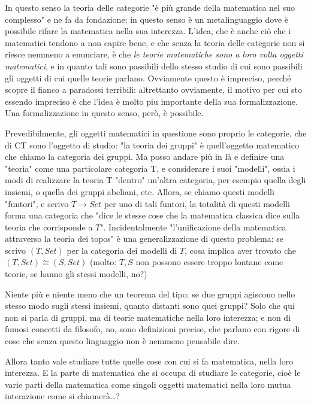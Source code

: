 \documentclass[a4paper, 11pt]{article}
\begin{document}
{	In questo senso la teoria delle categorie "è più grande della matematica nel suo complesso" e ne fa da fondazione; in questo senso è un metalinguaggio dove è possibile rifare la matematica nella sua interezza. L'idea, che è anche ciò che i matematici tendono a non capire bene, e che senza la teoria delle categorie non si riesce nemmeno a enunciare, è che \emph{le teorie matematiche sono a loro volta oggetti matematici}, e in quanto tali sono passibili dello stesso studio di cui sono passibili gli oggetti di cui quelle teorie parlano. Ovviamente questo è impreciso, perché scopre il fianco a paradossi terribili: altrettanto ovviamente, il motivo per cui sto essendo impreciso è che l'idea è molto piu importante della sua formalizzazione. Una formalizzazione in questo senso, però, è possibile.

	Prevedibilmente, gli oggetti matematici in questione sono proprio le categorie, che di CT sono l'oggetto di studio: "la teoria dei gruppi" è quell'oggetto matematico che chiamo la categoria dei gruppi. Ma posso andare più in là e definire una "teoria" come una particolare categoria T, e considerare i suoi "modelli", ossia i modi di realizzare la teoria T "dentro" un'altra categoria, per esempio quella degli insiemi, o quella dei gruppi abeliani, etc. Allora, se chiamo questi modelli "funtori", e scrivo $T \to Set$ per uno di tali funtori, la totalità di questi modelli forma una categoria che "dice le stesse cose che la matematica classica dice sulla teoria che corrisponde a $T$". Incidentalmente "l'unificazione della matematica attraverso la teoria dei topos" è una generalizzazione di questo problema: se scrivo $(T,Set)$ per la categoria dei modelli di $T$, cosa implica aver trovato che $(T,Set)\cong (S,Set)$ (molto: $T,S$ non possono essere troppo lontane come teorie, se hanno gli stessi modelli, no?)

	Niente più e niente meno che un teorema del tipo: se due gruppi agiscono nello stesso modo sugli stessi insiemi, quanto distanti sono quei gruppi? Solo che qui non si parla di gruppi, ma di teorie matematiche nella loro interezza; e non di fumosi concetti da filosofo, no, sono definizioni precise, che parlano con rigore di cose che senza questo linguaggio non è nemmeno pensabile dire.

	Allora tanto vale studiare tutte quelle cose con cui si fa matematica, nella loro interezza. E la parte di matematica che si occupa di studiare le categorie, cioè le varie parti della matematica come singoli oggetti matematici nella loro mutua interazione come si chiamerà\dots?}\endfo
\end{document}
